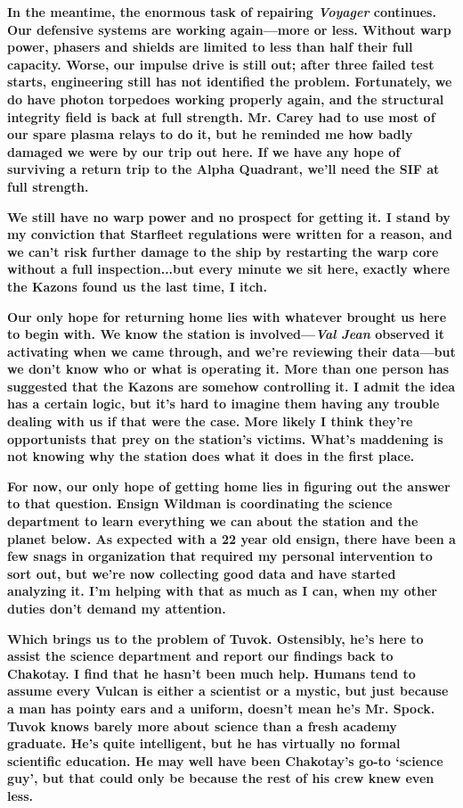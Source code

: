 \documentclass[twoside,letterpaper,12pt]{memoir}
\begin{document}
\textbf{In the meantime, the enormous task of repairing \textit{Voyager} continues. Our defensive systems are working again---more or less. Without warp power, phasers and shields are limited to less than half their full capacity. Worse, our impulse drive is still out; after three failed test starts, engineering still has not identified the problem. Fortunately, we do have photon torpedoes working properly again, and the structural integrity field is back at full strength. Mr. Carey had to use most of our spare plasma relays to do it, but he reminded me how badly damaged we were by our trip out here. If we have any hope of surviving a return trip to the Alpha Quadrant, we'll need the SIF at full strength.}

\textbf{We still have no warp power and no prospect for getting it. I stand by my conviction that Starfleet regulations were written for a reason, and we can't risk further damage to the ship by restarting the warp core without a full inspection...but every minute we sit here, exactly where the Kazons found us the last time, I itch.}

\textbf{Our only hope for returning home lies with whatever brought us here to begin with. We know the station is involved—\textit{Val Jean }observed it activating when we came through, and we’re reviewing their data—but we don’t know who or what is operating it. More than one person has suggested that the Kazons are somehow controlling it. I admit the idea has a certain logic, but it’s hard to imagine them having any trouble dealing with us if that were the case. More likely I think they’re opportunists that prey on the station’s victims. What’s maddening is not knowing why the station does what it does in the first place.}

\textbf{For now, our only hope of getting home lies in figuring out the answer to that question. Ensign Wildman is coordinating the science department to learn everything we can about the station and the planet below. As expected with a 22 year old ensign, there have been a few snags in organization that required my personal intervention to sort out, but we're now collecting good data and have started analyzing it. I'm helping with that as much as I can, when my other duties don't demand my attention.}

\textbf{Which brings us to the problem of Tuvok. Ostensibly, he's here to assist the science department and report our findings back to Chakotay. I find that he hasn't been much help. Humans tend to assume every Vulcan is either a scientist or a mystic, but just because a man has pointy ears and a uniform, doesn't mean he's Mr. Spock. Tuvok knows barely more about science than a fresh academy graduate. He’s quite intelligent, but he has virtually no formal scientific education. He may well have been Chakotay's go-to `science guy', but that could only be because the rest of his crew knew even less. }
\end{document}
